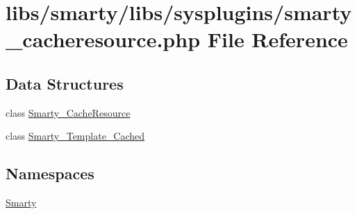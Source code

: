 \hypertarget{smarty__cacheresource_8php}{}\section{libs/smarty/libs/sysplugins/smarty\+\_\+cacheresource.php File Reference}
\label{smarty__cacheresource_8php}
\subsection*{Data Structures}
\begin{DoxyCompactItemize}
\item 
class \hyperlink{class_smarty___cache_resource}{Smarty\+\_\+\+Cache\+Resource}
\item 
class \hyperlink{class_smarty___template___cached}{Smarty\+\_\+\+Template\+\_\+\+Cached}
\end{DoxyCompactItemize}
\subsection*{Namespaces}
\begin{DoxyCompactItemize}
\item 
 \hyperlink{namespace_smarty}{Smarty}
\end{DoxyCompactItemize}

